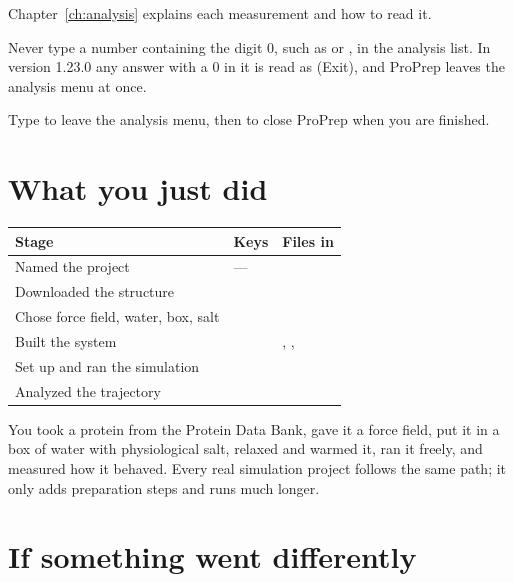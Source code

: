 \medskip
Chapter~\ref{ch:analysis} explains each measurement and how to read it.

\begin{watchout}
Never type a number containing the digit 0, such as  or , in
the analysis list. In version 1.23.0 any answer with a 0 in it is read as
 (Exit), and ProPrep leaves the analysis menu at once.
\end{watchout}

\begin{steps}[resume]
  \item Type  to leave the analysis menu, then  to close
        ProPrep when you are finished.
\end{steps}

\section{What you just did}

\begin{tabularx}{\linewidth}{@{}llL@{}}
\toprule
\textbf{Stage} & \textbf{Keys} & \textbf{Files in } \\
\midrule
Named the project & --- &  \\
Downloaded the structure &  &  \\
Chose force field, water, box, salt &   &  \\
Built the system &   & , ,
   \\
Set up and ran the simulation &   &  \\
Analyzed the trajectory &   &  \\
\bottomrule
\end{tabularx}

\medskip
You took a protein from the Protein Data Bank, gave it a force field, put it
in a box of water with physiological salt, relaxed and warmed it, ran it
freely, and measured how it behaved. Every real simulation project follows
the same path; it only adds preparation steps and runs much longer.

\section{If something went differently}

